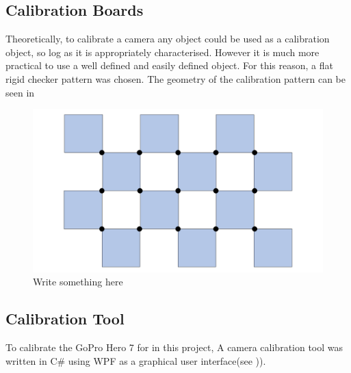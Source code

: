 \documentclass{UoNMCHA}
\numberwithin{equation}{section}
\begin{document}
\subsection{Calibration Boards}
Theoretically, to calibrate a camera any object could be used as a calibration object, so log as it is appropriately characterised. However it is much more practical to use a well defined and easily defined object. For this reason, a flat rigid checker pattern was chosen. The geometry of the calibration pattern can be seen in 

\begin{figure}[ht]
    \begin{center}
        \includegraphics[width=.6\linewidth]{Figures/CalibCornerLocations}
        \caption{Write something here}
        \label{fig:cornerLocations}
    \end{center}
\end{figure}


\subsection{Calibration Tool}
To calibrate the GoPro Hero 7 for in this project, A camera calibration tool was written in C\# using WPF as a graphical user interface(see )). 
\end{document}
